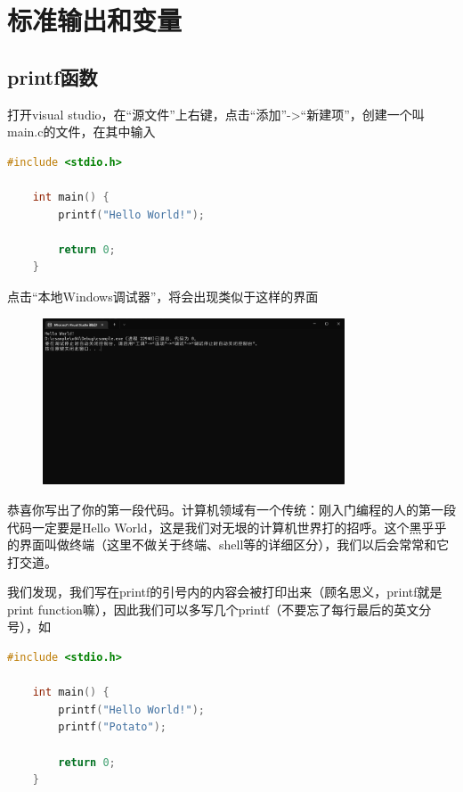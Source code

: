 \section{标准输出和变量}

\subsection{printf函数}

打开visual studio，在“源文件”上右键，点击“添加”->“新建项”，创建一个叫main.c的文件，在其中输入

\begin{lstlisting}[language=C]
    #include <stdio.h>
    
    int main() {
        printf("Hello World!");

        return 0;
    }
\end{lstlisting}

点击“本地Windows调试器”，将会出现类似于这样的界面

\begin{figure}[ht]
    \centering
    \includegraphics[width=0.8\textwidth, height=0.4\textheight]{images/1HelloWorld结果.png}
\end{figure}

恭喜你写出了你的第一段代码。计算机领域有一个传统：刚入门编程的人的第一段代码一定要是Hello World，这是我们对无垠的计算机世界打的招呼。这个黑乎乎的界面叫做终端（这里不做关于终端、shell等的详细区分），我们以后会常常和它打交道。

我们发现，我们写在printf的引号内的内容会被打印出来（顾名思义，printf就是print function嘛），因此我们可以多写几个printf（不要忘了每行最后的英文分号），如

\begin{lstlisting}[language=C]
    #include <stdio.h>
    
    int main() {
        printf("Hello World!");
        printf("Potato");

        return 0;
    }
\end{lstlisting}

